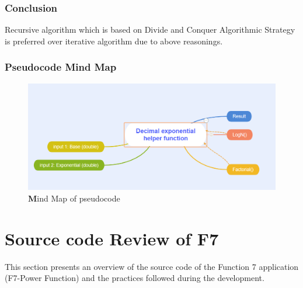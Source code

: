 \documentclass{article}
\begin{document}
\subsubsection*{Conclusion}
Recursive algorithm which is based on Divide and Conquer Algorithmic Strategy is preferred over iterative algorithm due to above reasonings. \subsubsection*{Pseudocode Mind Map}
\begin{figure}[htb]
\includegraphics[width=12cm]{pseudo}
\centering
\caption{\textbf Mind Map of pseudocode}
\end{figure}
\pagebreak
\newpage
{}
\section*{}
\section*{\textbf{Source code Review of F7}}
This section presents an overview of the source code of the Function 7 application \\(F7-Power Function)  and the
practices followed during the development.
\end{document}
